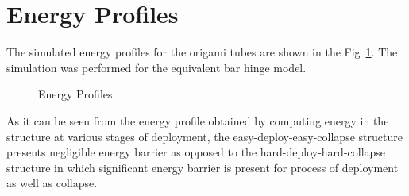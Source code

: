 \section{Energy Profiles}
The simulated energy profiles for the origami tubes are shown in the Fig~\ref{fig:EnergyProfile}. The simulation was performed for the equivalent bar hinge model.
\begin{figure}[htbp]
\centering
	\caption{Energy Profiles}
	\label{fig:EnergyProfile}
\end{figure}

As it can be seen from the energy profile obtained by computing energy in the structure at various stages of deployment, the easy-deploy-easy-collapse structure presents negligible energy barrier as opposed to the hard-deploy-hard-collapse structure in which significant energy barrier is present for process of deployment as well as collapse. 

